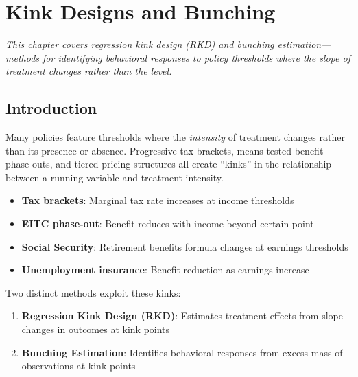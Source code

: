 
\chapter{Kink Designs and Bunching}
\label{ch:kink_bunching}

\emph{This chapter covers regression kink design (RKD) and bunching estimation---methods for identifying behavioral responses to policy thresholds where the slope of treatment changes rather than the level.}

\section{Introduction}
\label{sec:kink_intro}

Many policies feature thresholds where the \emph{intensity} of treatment changes rather than its presence or absence. Progressive tax brackets, means-tested benefit phase-outs, and tiered pricing structures all create ``kinks'' in the relationship between a running variable and treatment intensity.

\begin{example}
\begin{itemize}
    \item \textbf{Tax brackets}: Marginal tax rate increases at income thresholds
    \item \textbf{EITC phase-out}: Benefit reduces with income beyond certain point
    \item \textbf{Social Security}: Retirement benefits formula changes at earnings thresholds
    \item \textbf{Unemployment insurance}: Benefit reduction as earnings increase
\end{itemize}
\end{example}

Two distinct methods exploit these kinks:
\begin{enumerate}
    \item \textbf{Regression Kink Design (RKD)}: Estimates treatment effects from slope changes in outcomes at kink points
    \item \textbf{Bunching Estimation}: Identifies behavioral responses from excess mass of observations at kink points
\end{enumerate}

